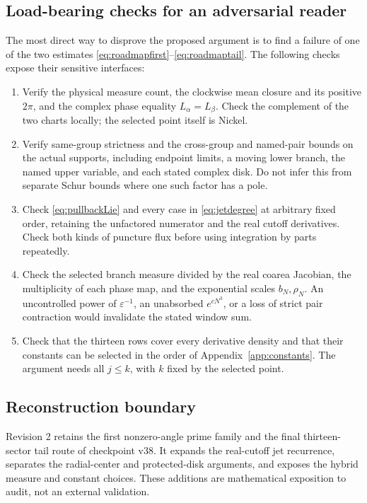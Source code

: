 \documentclass[11pt]{article}
\numberwithin{equation}{section}
\theoremstyle{definition}
\newcommand{\eps}{\varepsilon}
\begin{document}
\subsection{Load-bearing checks for an adversarial reader}
The most direct way to disprove the proposed argument is to
find a failure of one of the two estimates
\eqref{eq:roadmapfirst}--\eqref{eq:roadmaptail}.
The following checks expose their sensitive interfaces:
\begin{enumerate}
\item Verify the physical measure count, the clockwise mean
closure and its positive \(2\pi\), and the complex phase
equality \(L_\alpha=L_\beta\). Check the complement of the
two charts locally; the selected point itself is Nickel.
\item Verify same-group strictness and the cross-group and named-pair
bounds on the actual supports, including endpoint limits, a moving
lower branch, the named upper variable, and each stated
complex disk. Do not infer this from separate Schur bounds
where one such factor has a pole.
\item Check \eqref{eq:pullbackLie} and every case in
\eqref{eq:jetdegree} at arbitrary fixed order, retaining the
unfactored numerator and the real cutoff derivatives.
Check both kinds of puncture flux before using integration
by parts repeatedly.
\item Check the selected branch measure divided by the real
coarea Jacobian, the multiplicity of each phase map, and
the exponential scales \(b_N,\rho_N\).
An uncontrolled power of \(\eps^{-1}\), an unabsorbed
\(e^{cN^3}\), or a loss of strict pair contraction would
invalidate the stated window sum.
\item Check that the thirteen rows cover every derivative
density and that their constants can be selected in the
order of Appendix~\ref{app:constants}. The argument needs
all \(j\le k\), with \(k\) fixed by the selected point.
\end{enumerate}

\subsection{Reconstruction boundary}
Revision 2 retains the first nonzero-angle prime family and
the final thirteen-sector tail route of checkpoint v38.
It expands the real-cutoff jet recurrence, separates the
radial-center and protected-disk arguments, and exposes the
hybrid measure and constant choices. These additions are
mathematical exposition to audit, not an external validation.
\end{document}
